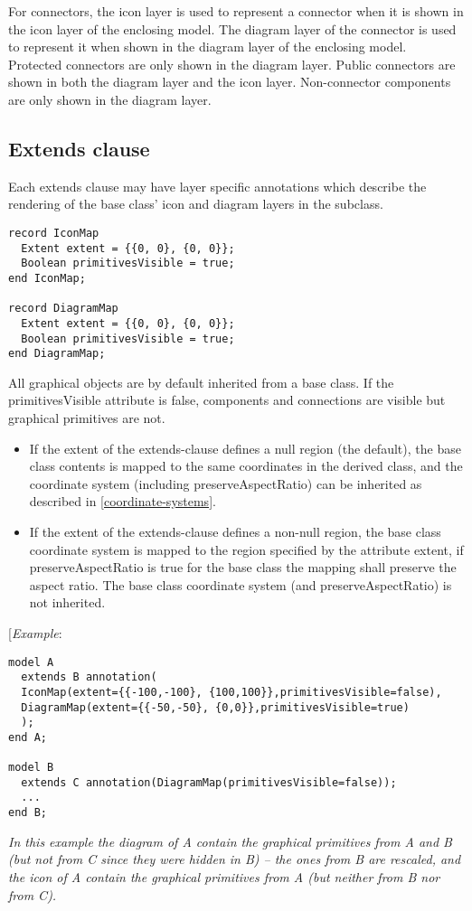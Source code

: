 For connectors, the icon layer is used to represent a connector when it
is shown in the icon layer of the enclosing model. The diagram layer of
the connector is used to represent it when shown in the diagram layer of
the enclosing model. Protected connectors are only shown in the diagram
layer. Public connectors are shown in both the diagram layer and the
icon layer. Non-connector components are only shown in the diagram
layer.

\subsection{Extends clause}

Each extends clause may have layer specific annotations which describe
the rendering of the base class' icon and diagram layers in the
subclass.

\begin{lstlisting}[language=modelica]
record IconMap
  Extent extent = {{0, 0}, {0, 0}};
  Boolean primitivesVisible = true;
end IconMap;

record DiagramMap
  Extent extent = {{0, 0}, {0, 0}};
  Boolean primitivesVisible = true;
end DiagramMap;
\end{lstlisting}
All graphical objects are by default inherited from a base class. If the
primitivesVisible attribute is false, components and connections are
visible but graphical primitives are not.

\begin{itemize}
\item
  If the extent of the extends-clause defines a null region (the
  default), the base class contents is mapped to the same coordinates in
  the derived class, and the coordinate system (including
  preserveAspectRatio) can be inherited as described in
  \ref{coordinate-systems}.
\item
  If the extent of the extends-clause defines a non-null region, the
  base class coordinate system is mapped to the region specified by the
  attribute extent, if preserveAspectRatio is true for the base class
  the mapping shall preserve the aspect ratio. The base class coordinate
  system (and preserveAspectRatio) is not inherited.
\end{itemize}

{[}\emph{Example}:

\begin{lstlisting}[language=modelica]
model A
  extends B annotation(
  IconMap(extent={{-100,-100}, {100,100}},primitivesVisible=false),
  DiagramMap(extent={{-50,-50}, {0,0}},primitivesVisible=true)
  );
end A;

model B
  extends C annotation(DiagramMap(primitivesVisible=false));
  ...
end B;
\end{lstlisting}
\emph{In this example the diagram of A contain the graphical primitives
from A and B (but not from C since they were hidden in B) -- the ones
from B are rescaled, and the icon of A contain the graphical primitives
from A (but neither from B nor from C).}

